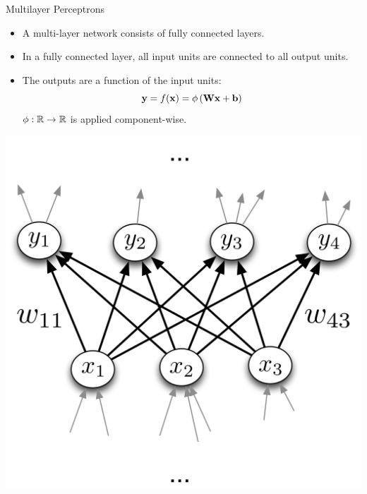 \documentclass[handout,aspectratio=169]{beamer}
\begin{document}
\begin{frame}{Multilayer Perceptrons}
\begin{itemize}
\item A multi-layer network consists of fully connected layers.
\item In a fully connected layer, all input units are connected to 
all output units.
\pause
\item The outputs are a function of the input units:
        \[ \mathbf{y} = f({\bf x}) = \phi \left( \mathbf{W} {\bf x} + \mathbf{b} \right) \]
        $\phi:\mathbb R\to \mathbb R$ is applied \alert{component-wise}.
\end{itemize}
\vspace{-4mm}
\begin{center}
  \includegraphics[width=0.3\linewidth]{pics/fc_layer.png}
\end{center}
\end{frame}
\end{document}
